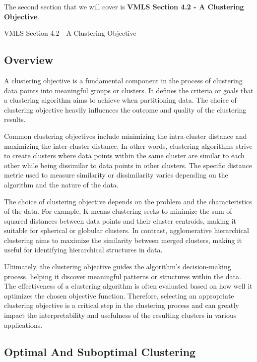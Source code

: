 The second section that we will cover is \textbf{VMLS Section 4.2 - A Clustering Objective}.

\begin{notes}{VMLS Section 4.2 - A Clustering Objective}
    \subsection*{Overview}

    A clustering objective is a fundamental component in the process of clustering data points into meaningful groups or clusters. It defines the criteria or goals that a clustering algorithm aims to 
    achieve when partitioning data. The choice of clustering objective heavily influences the outcome and quality of the clustering results.

    Common clustering objectives include minimizing the intra-cluster distance and maximizing the inter-cluster distance. In other words, clustering algorithms strive to create clusters where data 
    points within the same cluster are similar to each other while being dissimilar to data points in other clusters. The specific distance metric used to measure similarity or dissimilarity varies 
    depending on the algorithm and the nature of the data.

    The choice of clustering objective depends on the problem and the characteristics of the data. For example, K-means clustering seeks to minimize the sum of squared distances between data points and 
    their cluster centroids, making it suitable for spherical or globular clusters. In contrast, agglomerative hierarchical clustering aims to maximize the similarity between merged clusters, making it 
    useful for identifying hierarchical structures in data.

    Ultimately, the clustering objective guides the algorithm's decision-making process, helping it discover meaningful patterns or structures within the data. The effectiveness of a clustering algorithm 
    is often evaluated based on how well it optimizes the chosen objective function. Therefore, selecting an appropriate clustering objective is a critical step in the clustering process and can greatly 
    impact the interpretability and usefulness of the resulting clusters in various applications.

    \subsection*{Optimal And Suboptimal Clustering}


\end{notes}
